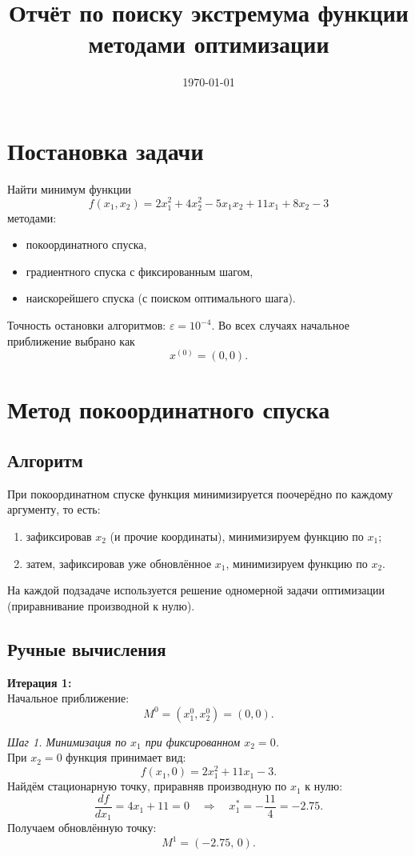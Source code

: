 \documentclass{article}
\begin{document}
\title{Отчёт по поиску экстремума функции методами оптимизации}
\author{ }
\date{\today}
\maketitle

\section{Постановка задачи}
Найти минимум функции
\[
f(x_1,x_2)=2x_1^2+4x_2^2-5x_1x_2+11x_1+8x_2-3
\]
методами:
\begin{itemize}
    \item покоординатного спуска,
    \item градиентного спуска с фиксированным шагом,
    \item наискорейшего спуска (с поиском оптимального шага).
\end{itemize}
Точность остановки алгоритмов: \(\varepsilon=10^{-4}\). Во всех случаях начальное приближение выбрано как
\[
x^{(0)}=(0,0).
\]

\section{Метод покоординатного спуска}
\subsection{Алгоритм}
При покоординатном спуске функция минимизируется поочерёдно по каждому аргументу, то есть:
\begin{enumerate}
    \item зафиксировав \(x_2\) (и прочие координаты), минимизируем функцию по \(x_1\);
    \item затем, зафиксировав уже обновлённое \(x_1\), минимизируем функцию по \(x_2\).
\end{enumerate}
На каждой подзадаче используется решение одномерной задачи оптимизации (приравнивание производной к нулю).

\subsection{Ручные вычисления}
\textbf{Итерация 1:} \\
Начальное приближение: 
\[
M^0=(x_1^0,x_2^0)=(0,0).
\]

\medskip
\emph{Шаг 1. Минимизация по \(x_1\) при фиксированном \(x_2=0\).} \\
При \(x_2=0\) функция принимает вид:
\[
f(x_1,0)=2x_1^2+11x_1-3.
\]
Найдём стационарную точку, приравняв производную по \(x_1\) к нулю:
\[
\frac{d f}{dx_1}=4x_1+11=0 \quad \Longrightarrow \quad x_1^*=-\frac{11}{4}=-2.75.
\]
Получаем обновлённую точку:
\[
M^1=(-2.75,\,0).
\]
\end{document}
